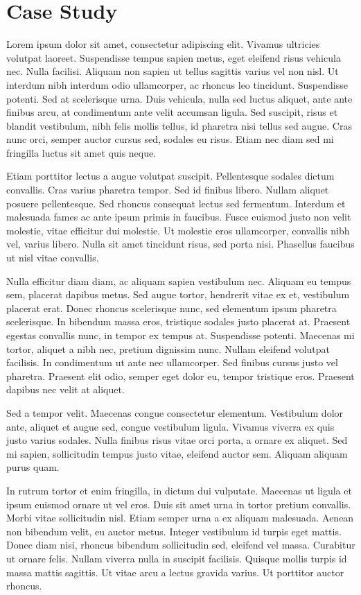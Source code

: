 \documentclass[conference]{IEEEtran}
\begin{document}
\section{Case Study}


Lorem ipsum dolor sit amet, consectetur adipiscing elit. Vivamus ultricies volutpat laoreet. Suspendisse tempus sapien metus, eget eleifend risus vehicula nec. Nulla facilisi. Aliquam non sapien ut tellus sagittis varius vel non nisl. Ut interdum nibh interdum odio ullamcorper, ac rhoncus leo tincidunt. Suspendisse potenti. Sed at scelerisque urna. Duis vehicula, nulla sed luctus aliquet, ante ante finibus arcu, at condimentum ante velit accumsan ligula. Sed suscipit, risus et blandit vestibulum, nibh felis mollis tellus, id pharetra nisi tellus sed augue. Cras nunc orci, semper auctor cursus sed, sodales eu risus. Etiam nec diam sed mi fringilla luctus sit amet quis neque.

Etiam porttitor lectus a augue volutpat suscipit. Pellentesque sodales dictum convallis. Cras varius pharetra tempor. Sed id finibus libero. Nullam aliquet posuere pellentesque. Sed rhoncus consequat lectus sed fermentum. Interdum et malesuada fames ac ante ipsum primis in faucibus. Fusce euismod justo non velit molestie, vitae efficitur dui molestie. Ut molestie eros ullamcorper, convallis nibh vel, varius libero. Nulla sit amet tincidunt risus, sed porta nisi. Phasellus faucibus ut nisl vitae convallis.

Nulla efficitur diam diam, ac aliquam sapien vestibulum nec. Aliquam eu tempus sem, placerat dapibus metus. Sed augue tortor, hendrerit vitae ex et, vestibulum placerat erat. Donec rhoncus scelerisque nunc, sed elementum ipsum pharetra scelerisque. In bibendum massa eros, tristique sodales justo placerat at. Praesent egestas convallis nunc, in tempor ex tempus at. Suspendisse potenti. Maecenas mi tortor, aliquet a nibh nec, pretium dignissim nunc. Nullam eleifend volutpat facilisis. In condimentum ut ante nec ullamcorper. Sed finibus cursus justo vel pharetra. Praesent elit odio, semper eget dolor eu, tempor tristique eros. Praesent dapibus nec velit at aliquet.

Sed a tempor velit. Maecenas congue consectetur elementum. Vestibulum dolor ante, aliquet et augue sed, congue vestibulum ligula. Vivamus viverra ex quis justo varius sodales. Nulla finibus risus vitae orci porta, a ornare ex aliquet. Sed mi sapien, sollicitudin tempus justo vitae, eleifend auctor sem. Aliquam aliquam purus quam.

In rutrum tortor et enim fringilla, in dictum dui vulputate. Maecenas ut ligula et ipsum euismod ornare ut vel eros. Duis sit amet urna in tortor pretium convallis. Morbi vitae sollicitudin nisl. Etiam semper urna a ex aliquam malesuada. Aenean non bibendum velit, eu auctor metus. Integer vestibulum id turpis eget mattis. Donec diam nisi, rhoncus bibendum sollicitudin sed, eleifend vel massa. Curabitur ut ornare felis. Nullam viverra nulla in suscipit facilisis. Quisque mollis turpis id massa mattis sagittis. Ut vitae arcu a lectus gravida varius. Ut porttitor auctor rhoncus.
\end{document}
